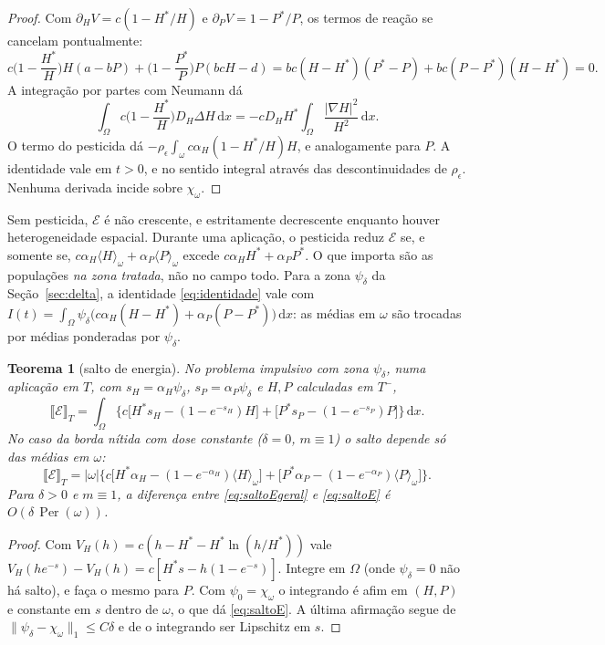 \documentclass[11pt,a4paper]{article}
\numberwithin{equation}{section}
\newtheorem{teorema}{Teorema}[section]
\theoremstyle{definition}
\theoremstyle{remark}
\newcommand{\E}{\mathcal{E}}
\newcommand{\jump}[1]{\llbracket #1 \rrbracket}
\newcommand{\dd}{\,\mathrm{d}}
\newcommand{\Hs}{H^{*}}
\newcommand{\Ps}{P^{*}}
\newcommand{\Per}{\operatorname{Per}}
\newcommand{\med}[1]{\langle #1\rangle_\omega}
\begin{document}
\begin{proof}
Com $\partial_HV=c(1-\Hs/H)$ e $\partial_PV=1-\Ps/P$, os termos de reação se cancelam pontualmente:
\[
c\Big(1-\frac{\Hs}H\Big)H(a-bP)+\Big(1-\frac{\Ps}P\Big)P(bcH-d)=bc(H-\Hs)(\Ps-P)+bc(P-\Ps)(H-\Hs)=0 .
\]
A integração por partes com Neumann dá
\[\int_\Omega c\Big(1-\frac{\Hs}H\Big)D_H\Delta H\dd x=-cD_H\Hs\int_\Omega\frac{|\nabla H|^2}{H^2}\dd x.\]
O termo do pesticida dá
$-\rho_\epsilon\int_\omega c\alpha_H(1-\Hs/H)H$, e analogamente para $P$. A identidade vale em $t>0$, e
no sentido integral através das descontinuidades de $\rho_\epsilon$. Nenhuma derivada incide sobre
$\chi_\omega$.
\end{proof}

Sem pesticida, $\E$ é não crescente, e estritamente decrescente enquanto houver heterogeneidade
espacial. Durante uma aplicação, o pesticida reduz $\E$ se, e somente se, $c\alpha_H\med H+\alpha_P\med P$
excede $c\alpha_H\Hs+\alpha_P\Ps$. O que importa são as populações \emph{na zona tratada}, não no
campo todo. Para a zona $\psi_\delta$ da Seção~\ref{sec:delta}, a identidade \eqref{eq:identidade} vale
com $I(t)=\int_\Omega\psi_\delta\big(c\alpha_H(H-\Hs)+\alpha_P(P-\Ps)\big)\dd x$: as médias em $\omega$ são
trocadas por médias ponderadas por $\psi_\delta$.

\begin{teorema}[salto de energia]\label{teo:salto}
No problema impulsivo com zona $\psi_\delta$, numa aplicação em $T$, com $s_H=\alpha_H\psi_\delta$,
$s_P=\alpha_P\psi_\delta$ e $H,P$ calculadas em $T^-$,
\begin{equation}\label{eq:saltoEgeral}
\jump{\E}_T=\int_\Omega\Big\{c\big[\Hs s_H-(1-e^{-s_H})H\big]+\big[\Ps s_P-(1-e^{-s_P})P\big]\Big\}\dd x .
\end{equation}
No caso da borda nítida com dose constante ($\delta=0$, $m\equiv1$) o salto depende só das médias em $\omega$:
\begin{equation}\label{eq:saltoE}
\jump{\E}_T=|\omega|\Big\{c\big[\Hs\alpha_H-(1-e^{-\alpha_H})\med H\big]+\big[\Ps\alpha_P-(1-e^{-\alpha_P})\med P\big]\Big\}.
\end{equation}
Para $\delta>0$ e $m\equiv1$, a diferença entre \eqref{eq:saltoEgeral} e \eqref{eq:saltoE} é $O(\delta\,\Per(\omega))$.
\end{teorema}

\begin{proof}
Com $V_H(h)=c(h-\Hs-\Hs\ln(h/\Hs))$ vale $V_H(he^{-s})-V_H(h)=c[\Hs s-h(1-e^{-s})]$. Integre em $\Omega$
(onde $\psi_\delta=0$ não há salto), e faça o mesmo para $P$. Com $\psi_0=\chi_\omega$ o integrando é afim
em $(H,P)$ e constante em $s$ dentro de $\omega$, o que dá \eqref{eq:saltoE}. A última afirmação segue de
$\|\psi_\delta-\chi_\omega\|_1\le C\delta$ e de o integrando ser Lipschitz em $s$.
\end{proof}
\end{document}
